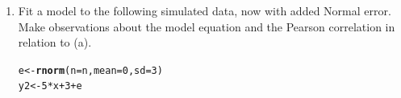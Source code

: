 \documentclass{article}\usepackage[]{graphicx}\usepackage[]{color}
\makeatletter
\newcommand{\hlnum}[1]{\textcolor[rgb]{0.686,0.059,0.569}{#1}}%
\newcommand{\hlopt}[1]{\textcolor[rgb]{0,0,0}{#1}}%
\newcommand{\hlstd}[1]{\textcolor[rgb]{0.345,0.345,0.345}{#1}}%
\newcommand{\hlkwb}[1]{\textcolor[rgb]{0.69,0.353,0.396}{#1}}%
\newcommand{\hlkwc}[1]{\textcolor[rgb]{0.333,0.667,0.333}{#1}}%
\newcommand{\hlkwd}[1]{\textcolor[rgb]{0.737,0.353,0.396}{\textbf{#1}}}%
\newenvironment{kframe}{%
 \def\at@end@of@kframe{}%
 \ifinner\ifhmode%
  \def\at@end@of@kframe{\end{minipage}}%
  \begin{minipage}{\columnwidth}%
 \fi\fi%
 \def\FrameCommand##1{\hskip\@totalleftmargin \hskip-\fboxsep
 \colorbox{shadecolor}{##1}\hskip-\fboxsep
     \hskip-\linewidth \hskip-\@totalleftmargin \hskip\columnwidth}%
 \MakeFramed {\advance\hsize-\width
   \@totalleftmargin\z@ \linewidth\hsize
   \@setminipage}}%
 {\par\unskip\endMakeFramed%
 \at@end@of@kframe}
\newenvironment{knitrout}{}{} %
\makeatother
\begin{document}
\begin{enumerate}
\begin{enumerate}
  \item Fit a model to the following simulated data, now with added Normal error. Make
  observations about the model equation and the Pearson correlation in relation to (a).
\begin{knitrout}
\color{fgcolor}\begin{kframe}
\begin{alltt}
\hlstd{e}\hlkwb{<-}\hlkwd{rnorm}\hlstd{(}\hlkwc{n}\hlstd{=n,}\hlkwc{mean}\hlstd{=}\hlnum{0}\hlstd{,}\hlkwc{sd}\hlstd{=}\hlnum{3}\hlstd{)}
\hlstd{y2}\hlkwb{<-}\hlnum{5}\hlopt{*}\hlstd{x} \hlopt{+} \hlnum{3} \hlopt{+} \hlstd{e}
\end{alltt}
\end{kframe}
\end{knitrout}


\end{enumerate}
\end{enumerate}
\end{document}
